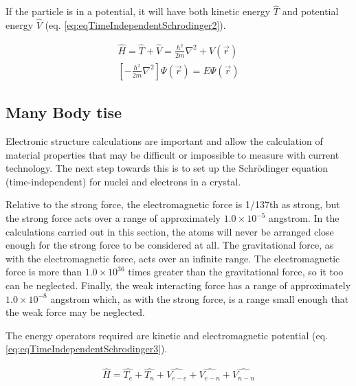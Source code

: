 If the particle is in a potential, it will have both kinetic energy $\hat{T}$ and potential energy $\hat{V}$ (eq. \ref{eq:eqTimeIndependentSchrodinger2}).

\begin{equation}
\begin{split}
\hat{H} = \hat{T} + \hat{V} = \frac{\hbar^2}{2 m} \nabla^2 + V(\vec{r})\\
\left[-\frac{\hbar^2}{2 m} \nabla^2 \right] \Psi(\vec{r}) = E \Psi(\vec{r})
\end{split}
\label{eq:eqTimeIndependentSchrodinger2}
\end{equation}




\subsection{Many Body \acrshort{tise}}

Electronic structure calculations are important and allow the calculation of material properties that may be difficult or impossible to measure with current technology.  The next step towards this is to set up the Schr\"{o}dinger equation (time-independent) for nuclei and electrons in a crystal.  

Relative to the strong force, the electromagnetic force is 1/137th as strong, but the strong force acts over a range of approximately $1.0 \times 10^{-5}$ angstrom.  In the calculations carried out in this section, the atoms will never be arranged close enough for the strong force to be considered at all.  The gravitational force, as with the electromagnetic force, acts over an infinite range.  The electromagnetic force is more than $1.0 \times 10^{36}$ times greater than the gravitational force, so it too can be neglected.  Finally, the weak interacting force has a range of approximately $1.0 \times 10^{-8}$ angstrom which, as with the strong force, is a range small enough that the weak force may be neglected.

The energy operators required are kinetic and electromagnetic potential (eq. \ref{eq:eqTimeIndependentSchrodinger3}).

\begin{equation}
\begin{split}
\hat{H} = \hat{T_e} + \hat{T_n} + \hat{V_{e-e}} + \hat{V_{e-n}} + \hat{V_{n-n}}
\end{split}
\label{eq:eqTimeIndependentSchrodinger3}
\end{equation}

